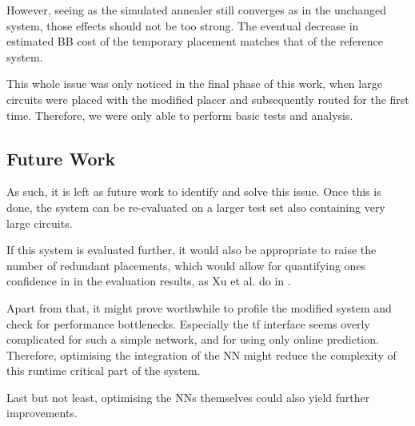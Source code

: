 However, seeing as the simulated annealer still converges as in the unchanged system, those effects should not be too strong. The eventual decrease in estimated \gls{BB} cost of the temporary placement matches that of the reference system.

This whole issue was only noticed in the final phase of this work, when large circuits were placed with the modified placer and subsequently routed for the first time. Therefore, we were only able to perform basic tests and analysis.

\subsection{Future Work}

As such, it is left as future work to identify and solve this issue. Once this is done, the system can be re-evaluated on a larger test set also containing very large circuits. 

If this system is evaluated further, it would also be appropriate to raise the number of redundant placements, which would allow for quantifying ones confidence in in the evaluation results, as Xu et al. do in \cite{star-plus-paper}.

Apart from that, it might prove worthwhile to profile the modified system and check for performance bottlenecks. Especially the \gls{tf} interface seems overly complicated for such a simple network, and for using only online prediction. Therefore, optimising the integration of the \gls{NN} might reduce the complexity of this runtime critical part of the system.

Last but not least, optimising the \glspl{NN} themselves could also yield further improvements.
